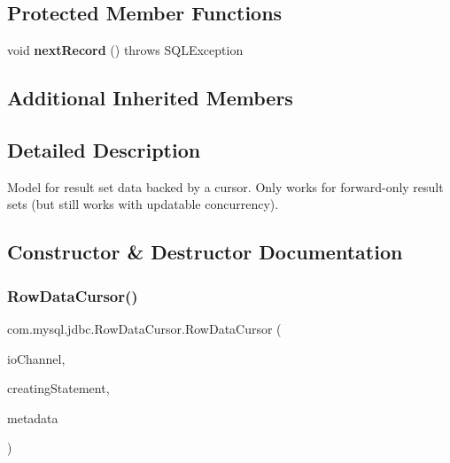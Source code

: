 \subsection*{Protected Member Functions}
\begin{DoxyCompactItemize}
\item 
\mbox{\label{classcom_1_1mysql_1_1jdbc_1_1_row_data_cursor_a832c5749e579fff293555520b4d3b220}} 
void {\bfseries next\+Record} ()  throws S\+Q\+L\+Exception 
\end{DoxyCompactItemize}
\subsection*{Additional Inherited Members}


\subsection{Detailed Description}
Model for result set data backed by a cursor. Only works for forward-\/only result sets (but still works with updatable concurrency). 

\subsection{Constructor \& Destructor Documentation}
\mbox{\label{classcom_1_1mysql_1_1jdbc_1_1_row_data_cursor_a5c4df32b4bdf5e09cb54a21bfc22363b}} 
\subsubsection{\texorpdfstring{Row\+Data\+Cursor()}{RowDataCursor()}}
{\footnotesize\ttfamily com.\+mysql.\+jdbc.\+Row\+Data\+Cursor.\+Row\+Data\+Cursor (\begin{DoxyParamCaption}\item[{\mbox{\hyperlink{classcom_1_1mysql_1_1jdbc_1_1_mysql_i_o}{Mysql\+IO}}}]{io\+Channel,  }\item[{\mbox{\hyperlink{classcom_1_1mysql_1_1jdbc_1_1_server_prepared_statement}{Server\+Prepared\+Statement}}}]{creating\+Statement,  }\item[{\mbox{\hyperlink{classcom_1_1mysql_1_1jdbc_1_1_field}{Field}} \mbox{[}$\,$\mbox{]}}]{metadata }\end{DoxyParamCaption})}

